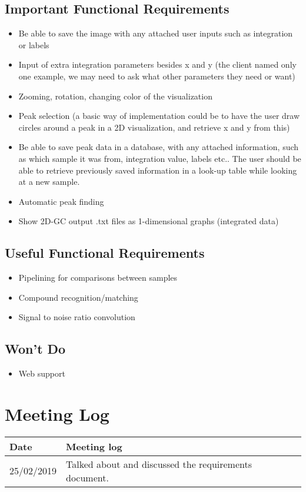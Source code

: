 \documentclass{article}
\begin{document}
\subsection*{Important Functional Requirements}
\begin{itemize}
    \item Be able to save the image with any attached user inputs such as integration or labels
	\item Input of extra integration parameters besides x and y (the client named only one example, we may need to ask what other parameters they need or want)
	\item Zooming, rotation, changing color of the visualization
	\item Peak selection (a basic way of implementation could be to have the user draw circles around a peak in a 2D visualization, and retrieve x and y from this)
    \item Be able to save peak data in a database, with any attached information, such as which sample it was from, integration value, labels etc.. The user should be able to retrieve previously saved information in a look-up table while looking at a new sample.
	\item Automatic peak finding
	\item Show 2D-GC output .txt files as 1-dimensional graphs (integrated data)
\end{itemize}

\subsection*{Useful Functional Requirements}
\begin{itemize}
	\item Pipelining for comparisons between samples
	\item Compound recognition/matching
	\item Signal to noise ratio convolution
\end{itemize}
\subsection*{Won't Do}
\begin{itemize}
	\item Web support
\end{itemize}

\section{Meeting Log}
\begin{center}
 \begin{tabular}{ | p{5cm} | p{5cm} | }
  \hline
  \bf{Date} & \bf{Meeting log} \\
  \hline
  25/02/2019 & Talked about and discussed the requirements document. \\
  \hline
 \end{tabular}
\end{center}
\end{document}
